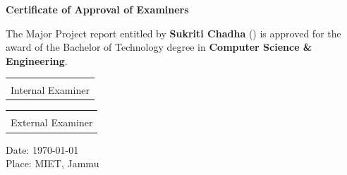\newpage
    \begin{center}
    
        \vspace*{0.1cm}
        \large
       

        
        \vspace{0.8cm}
        
        \large
        \textbf{Certificate of Approval of Examiners}\\
        \vspace{0.5cm}
        
    \end{center}


{\large The Major Project report entitled \textbf{\mytitle} by \textbf{Sukriti Chadha} (\myrollno) is approved for the award of the Bachelor of Technology degree in \textbf{Computer Science \& Engineering}.} 
\vspace{2cm}

    

\begin{table}[h]
\begin{flushright}
\begin{tabular}{c}
\hrulefill\\
\large Internal Examiner\\
\end{tabular}
\end{flushright}
\end{table}

\vspace{1cm}
\hfill
\begin{table}[h]
\begin{flushright}
\begin{tabular}{c}
\hrulefill\\
\large External Examiner
\end{tabular}
\end{flushright}
\end{table}

\vspace{1cm}
\noindent


\begin{flushleft}
{\large Date: \today}\\
{\large Place: MIET, Jammu}
\end{flushleft}
